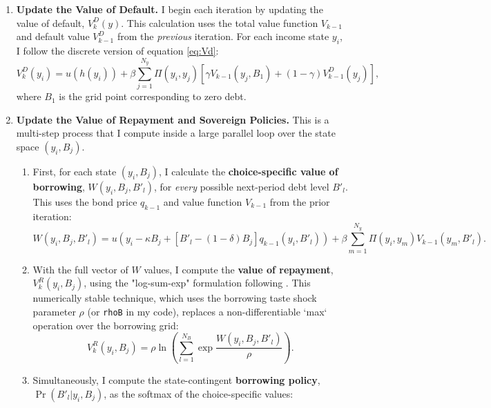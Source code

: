 \documentclass[12pt]{article}
\theoremstyle{plain}
\begin{document}
\begin{enumerate}
	\item \textbf{Update the Value of Default.} I begin each iteration by updating the value of default, $V^D_k(y)$. This calculation uses the total value function $V_{k-1}$ and default value $V^D_{k-1}$ from the \textit{previous} iteration. For each income state $y_i$, I follow the discrete version of equation \eqref{eq:Vd}:
	      \begin{equation*}
		      V^D_k(y_i) = u(h(y_i)) + \beta \sum_{j=1}^{N_y} \Pi(y_i, y_j) \left[ \gamma V_{k-1}(y_j, B_1) + (1-\gamma) V^D_{k-1}(y_j) \right],
	      \end{equation*}
	      where $B_1$ is the grid point corresponding to zero debt.

	\item \textbf{Update the Value of Repayment and Sovereign Policies.} This is a multi-step process that I compute inside a large parallel loop over the state space $(y_i, B_j)$.
	      \begin{enumerate}
		      \item First, for each state $(y_i, B_j)$, I calculate the \textbf{choice-specific
			            value of borrowing}, $W(y_i, B_j, B'_l)$, for \textit{every} possible
		            next-period debt level $B'_l$. This uses the bond price $q_{k-1}$ and value
		            function $V_{k-1}$ from the prior iteration:
		            \begin{equation*}
			            W(y_i, B_j, B'_l) = u(y_i - \kappa B_j + [B'_l - (1-\delta)B_j]q_{k-1}(y_i, B'_l)) + \beta \sum_{m=1}^{N_y} \Pi(y_i, y_m) V_{k-1}(y_m, B'_l).
		            \end{equation*}
		      \item With the full vector of $W$ values, I compute the \textbf{value of repayment},
		            $V^R_k(y_i, B_j)$, using the "log-sum-exp" formulation following
		            \citet{MIHALACHEOREEF2024}. This numerically stable technique, which uses the
		            borrowing taste shock parameter $\rho$ (or \texttt{rhoB} in my code), replaces
		            a non-differentiable `max` operation over the borrowing grid:
		            \begin{equation*}
			            V^R_k(y_i, B_j) = \rho \ln\left( \sum_{l=1}^{N_B} \exp\frac{W(y_i, B_j, B'_l)}{\rho} \right).
		            \end{equation*}
		      \item Simultaneously, I compute the state-contingent \textbf{borrowing policy},
		            $\Pr(B'_l | y_i, B_j)$, as the softmax of the choice-specific values:

\end{enumerate}
\end{enumerate}
\end{document}
